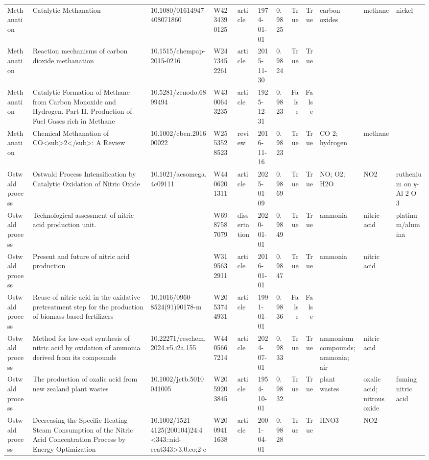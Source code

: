 \begin{tabular}{lllllllrrlll}
Methanation & Catalytic Methanation & 10.1080/01614947408071860 & W4234390125 & article & 1974-01-01 & 0.9825 & True & True & carbon oxides & methane & nickel \\
Methanation & Reaction mechanisms of carbon dioxide methanation & 10.1515/chempap-2015-0216 & W2473452261 & article & 2015-11-30 & 0.9824 & True & True &  &  &  \\
Methanation & Catalytic Formation of Methane from Carbon Monoxide and Hydrogen. Part II. Production of Fuel Gases rich in Methane & 10.5281/zenodo.6899494 & W4300643235 & article & 1925-12-31 & 0.9823 & False & False &  &  &  \\
Methanation & Chemical Methanation of CO<sub>2</sub>: A Review & 10.1002/cben.201600022 & W2553528523 & review & 2016-11-16 & 0.9823 & True & True & CO 2; hydrogen & methane &  \\
Ostwald process & Ostwald Process Intensification by Catalytic Oxidation of Nitric Oxide & 10.1021/acsomega.4c09111 & W4406201311 & article & 2025-01-09 & 0.9869 & True & True & NO; O2; H2O & NO2 & ruthenium on γ-Al 2 O 3 \\
Ostwald process & Technological assessment of nitric acid production unit. &  & W6987587079 & dissertation & 2020-01-01 & 0.9849 & True & True & ammonia & nitric acid & platinum/alumina \\
Ostwald process & Present and future of nitric acid production &  & W3195632911 & article & 2016-01-01 & 0.9847 & True & True & ammonia & nitric acid &  \\
Ostwald process & Reuse of nitric acid in the oxidative pretreatment step for the production of biomass-based fertilizers & 10.1016/0960-8524(91)90178-m & W2053744931 & article & 1991-01-01 & 0.9836 & False & False &  &  &  \\
Ostwald process & Method for low-cost synthesis of nitric acid by oxidation of ammonia derived from its compounds & 10.22271/reschem.2024.v5.i2a.155 & W4405667214 & article & 2024-07-01 & 0.9833 & True & True & ammonium compounds; ammonia; air & nitric acid &  \\
Ostwald process & The production of oxalic acid from new zealand plant wastes & 10.1002/jctb.5010041005 & W2059203845 & article & 1954-10-01 & 0.9832 & True & True & plant wastes & oxalic acid; nitrous oxide & fuming nitric acid \\
Ostwald process & Decreasing the Specific Heating Steam Consumption of the Nitric Acid Concentration Process by Energy Optimization & 10.1002/1521-4125(200104)24:4<343::aid-ceat343>3.0.co;2-c & W2009411638 & article & 2001-04-01 & 0.9828 & True & True & HNO3 & NO2 &  \\

\end{tabular}

